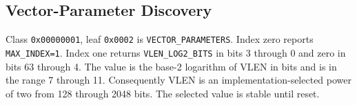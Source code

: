 \subsection{Vector-Parameter Discovery}
Class \texttt{0x00000001}, leaf \texttt{0x0002} is \texttt{VECTOR\_PARAMETERS}. Index zero reports
\texttt{MAX\_INDEX=1}. Index one returns \texttt{VLEN\_LOG2\_BITS} in bits 3 through 0 and zero in bits 63 through
4. The value is the base-2 logarithm of VLEN in bits and is in the range 7 through 11. Consequently VLEN is an
implementation-selected power of two from 128 through 2048 bits. The selected value is stable until reset.
